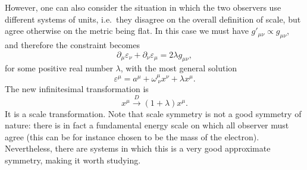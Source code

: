\documentclass[a4paper,12pt]{article}
\numberwithin{equation}{section}
\begin{document}
However, one can also consider the situation in which the two observers use different systems of units, i.e.~they disagree on the overall definition of scale, but agree otherwise on the metric being flat.
In this case we must have $g'_{\mu\nu} \propto g_{\mu\nu}$, and therefore the constraint becomes
\begin{equation}
	\partial_\mu \varepsilon_\nu
	+ \partial_\nu \varepsilon_\mu = 2 \lambda g_{\mu\nu},
\end{equation}
for some positive real number $\lambda$,
with the most general solution
\begin{equation}
	\varepsilon^\mu = a^\mu + \omega^\mu_{~\nu} x^\nu
	+ \lambda x^\mu.
\end{equation}
The new infinitesimal transformation is
\begin{equation}
	x^\mu \xrightarrow{D} (1 + \lambda) x^\mu.
\end{equation}
It is a scale transformation. Note that scale symmetry is not a good symmetry of nature: there is in fact a fundamental energy scale on which all observer must agree (this can be for instance chosen to be the mass of the electron).
Nevertheless, there are systems in which this is a very good approximate symmetry, making it worth studying.
\end{document}
